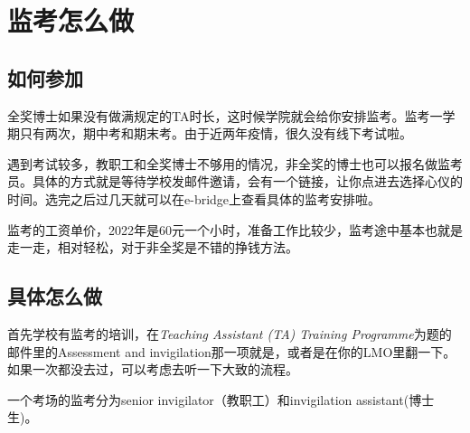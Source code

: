 \section{监考怎么做}

\subsection{如何参加}
全奖博士如果没有做满规定的TA时长，这时候学院就会给你安排监考。监考一学期只有两次，期中考和期末考。由于近两年疫情，很久没有线下考试啦。

遇到考试较多，教职工和全奖博士不够用的情况，非全奖的博士也可以报名做监考员。具体的方式就是等待学校发邮件邀请，会有一个链接，让你点进去选择心仪的时间。选完之后过几天就可以在e-bridge上查看具体的监考安排啦。

监考的工资单价，2022年是60元一个小时，准备工作比较少，监考途中基本也就是走一走，相对轻松，对于非全奖是不错的挣钱方法。

\subsection{具体怎么做}
首先学校有监考的培训，在\textit{Teaching Assistant (TA) Training Programme}为题的邮件里的Assessment and invigilation那一项就是，或者是在你的LMO里翻一下。如果一次都没去过，可以考虑去听一下大致的流程。

一个考场的监考分为senior invigilator（教职工）和invigilation assistant(博士生)。

